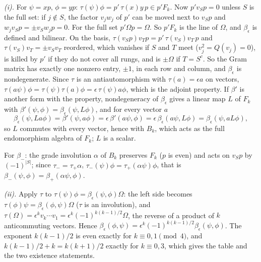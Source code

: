 \emph{(i).} For $\psi = xp$, $\phi = yp$: $\tau(\psi)\phi = p'\,\tau(x)y\,p \in p'F_{k}$. Now $p'v_{S}p = 0$ unless $S$ is the full set: if $j \notin S$, the factor $v_{j}w_{j}$ of $p'$ can be moved next to $v_{S}p$ and $w_{j}v_{S}p = \pm v_{S}w_{j}p = 0$. For the full set $p'\Omega p = \Omega$. So $p'F_{k}$ is the line of $\Omega$, and $\beta_{\epsilon}$ is defined and bilinear. On the basis, $\tau(v_{S}p)v_{T}p = p'\,\tau(v_{S})v_{T}\,p$ and $\tau(v_{S})v_{T} = \pm v_{S}v_{T}$ reordered, which vanishes if $S$ and $T$ meet ($v_{j}^{2} = Q(v_{j}) = 0$), is killed by $p'$ if they do not cover all rungs, and is $\pm\Omega$ if $T = S^{c}$. So the Gram matrix has exactly one nonzero entry, $\pm 1$, in each row and column, and $\beta_{\epsilon}$ is nondegenerate. Since $\tau$ is an antiautomorphism with $\tau(a) = \epsilon a$ on vectors, $\tau(a\psi)\phi = \tau(\psi)\tau(a)\phi = \epsilon\,\tau(\psi)a\phi$, which is the adjoint property. If $\beta'$ is another form with the property, nondegeneracy of $\beta_{\epsilon}$ gives a linear map $L$ of $F_{k}$ with $\beta'(\psi, \phi) = \beta_{\epsilon}(\psi, L\phi)$, and for every vector $a$
\[
\beta_{\epsilon}(\psi, La\phi) = \beta'(\psi, a\phi) = \epsilon\,\beta'(a\psi, \phi) = \epsilon\,\beta_{\epsilon}(a\psi, L\phi) = \beta_{\epsilon}(\psi, aL\phi),
\]
so $L$ commutes with every vector, hence with $B_{k}$, which acts as the full endomorphism algebra of $F_{k}$; $L$ is a scalar.

For $\beta_{-}$: the grade involution $\alpha$ of $B_{k}$ preserves $F_{k}$ ($p$ is even) and acts on $v_{S}p$ by $(-1)^{|S|}$; since $\tau_{-} = \tau_{+}\alpha$, $\tau_{-}(\psi)\phi = \tau_{+}(\alpha\psi)\phi$, that is $\beta_{-}(\psi, \phi) = \beta_{+}(\alpha\psi, \phi)$.

\emph{(ii).} Apply $\tau$ to $\tau(\psi)\phi = \beta_{\epsilon}(\psi, \phi)\Omega$: the left side becomes $\tau(\phi)\psi = \beta_{\epsilon}(\phi, \psi)\Omega$ ($\tau$ is an involution), and $\tau(\Omega) = \epsilon^{k}v_{k}\cdots v_{1} = \epsilon^{k}(-1)^{k(k-1)/2}\Omega$, the reverse of a product of $k$ anticommuting vectors. Hence $\beta_{\epsilon}(\phi, \psi) = \epsilon^{k}(-1)^{k(k-1)/2}\beta_{\epsilon}(\psi, \phi)$. The exponent $k(k-1)/2$ is even exactly for $k \equiv 0, 1 \pmod 4$, and $k(k-1)/2 + k = k(k+1)/2$ exactly for $k \equiv 0, 3$, which gives the table and the two existence statements.

